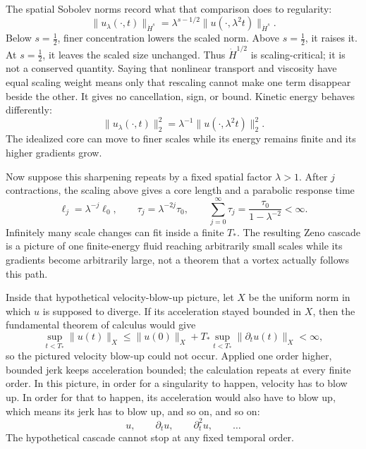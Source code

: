 The spatial Sobolev norms record what that comparison does to regularity:
\[
 \|u_\lambda(\cdot,t)\|_{\dot H^s}
 =\lambda^{s-1/2}
  \|u(\cdot,\lambda^2t)\|_{\dot H^s}.
\]
Below \(s=\tfrac12\), finer concentration lowers the scaled norm.  Above
\(s=\tfrac12\), it raises it.  At \(s=\tfrac12\), it leaves the scaled size
unchanged.  Thus \(\dot H^{1/2}\) is scaling-critical; it is not a conserved
quantity.  Saying that nonlinear transport and viscosity have equal scaling
weight means only that rescaling cannot make one term disappear beside the
other.  It gives no cancellation, sign, or bound.  Kinetic energy behaves
differently:
\[
 \|u_\lambda(\cdot,t)\|_2^2
 =\lambda^{-1}\|u(\cdot,\lambda^2t)\|_2^2.
\]
The idealized core can move to finer scales while its energy remains finite
and its higher gradients grow.

Now suppose this sharpening repeats by a fixed spatial factor \(\lambda>1\).
After \(j\) contractions, the scaling above gives a core length and a
parabolic response time
\[
 \ell_j=\lambda^{-j}\ell_0,
 \qquad
 \tau_j=\lambda^{-2j}\tau_0,
 \qquad
 \sum_{j=0}^{\infty}\tau_j
 =\frac{\tau_0}{1-\lambda^{-2}}<\infty.
\]
Infinitely many scale changes can fit inside a finite \(T_*\).  The resulting
Zeno cascade is a picture of one finite-energy fluid reaching arbitrarily
small scales while its gradients become arbitrarily large, not a theorem that
a vortex actually follows this path.

Inside that hypothetical velocity-blow-up picture, let \(X\) be the uniform
norm in which \(u\) is supposed to diverge.  If its acceleration stayed
bounded in \(X\), then the fundamental theorem of calculus would give
\[
 \sup_{t<T_*}\|u(t)\|_X
 \le \|u(0)\|_X
   +T_*\sup_{t<T_*}\|\partial_tu(t)\|_X<\infty,
\]
so the pictured velocity blow-up could not occur.  Applied one order higher,
bounded jerk keeps acceleration bounded; the calculation repeats at every
finite order.  In this picture, in order for a singularity to happen, velocity
has to blow up.  In order for that to happen, its acceleration would also have
to blow up, which means its jerk has to blow up, and so on, and so on:
\[
 u,\qquad \partial_tu,\qquad \partial_t^2u,\qquad\ldots
\]
The hypothetical cascade cannot stop at any fixed temporal order.


